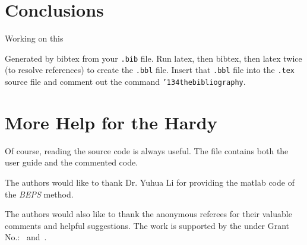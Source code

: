 \documentclass[sigconf]{acmart}
\begin{document}
\section{Conclusions}

Working on this



\appendix


Generated by bibtex from your \texttt{.bib} file.  Run latex, then
bibtex, then latex twice (to resolve references) to create the
\texttt{.bbl} file.  Insert that \texttt{.bbl} file into the
\texttt{.tex} source file and comment out the command
\texttt{{\char'134}thebibliography}.


\section{More Help for the Hardy}

Of course, reading the source code is always useful.  The file
 contains both the user guide and the commented code.

\begin{acks}

  The authors would like to thank Dr. Yuhua Li for providing the
  matlab code of the \textit{BEPS} method.

  The authors would also like to thank the anonymous referees for
  their valuable comments and helpful suggestions. The work is
  supported by the  under Grant
  No.:~
  and~.

\end{acks}


 
\end{document}
